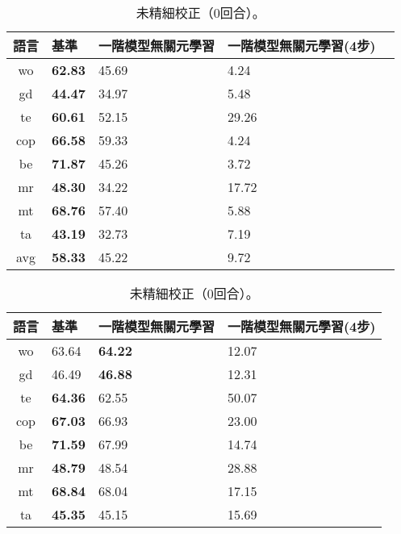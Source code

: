 \begin{table}[htbp]
    \begin{subtable}[h]{0.8\textwidth}
        \centering
            \begin{tabular}[!ht]{c|llll}
                \hline
                語言 & 基準 & 一階模型無關元學習 & 一階模型無關元學習(4步) \\
                \hline\hline
                wo & \textbf{62.83} & 45.69 & 4.24 \\
                gd & \textbf{44.47} & 34.97 & 5.48 \\
                te & \textbf{60.61} & 52.15 & 29.26 \\
                cop & \textbf{66.58} & 59.33 & 4.24 \\
                be & \textbf{71.87} & 45.26 & 3.72 \\
                mr & \textbf{48.30} & 34.22 & 17.72 \\
                mt & \textbf{68.76} & 57.40 & 5.88 \\
                ta & \textbf{43.19} & 32.73 & 7.19 \\
                \hline
                avg & \textbf{58.33} & 45.22 & 9.72 \\
                \hline
            \end{tabular}
            \caption{未精細校正（0回合）。}
    \end{subtable}
    \vfill
    \begin{subtable}[h]{0.8\textwidth}
        \centering
            \begin{tabular}[!ht]{c|lll}
                \hline
                語言 & 基準 & 一階模型無關元學習 & 一階模型無關元學習(4步) \\
                \hline\hline
                wo & 63.64 & \textbf{64.22} & 12.07 \\
                gd & 46.49 & \textbf{46.88} & 12.31 \\
                te & \textbf{64.36} & 62.55 & 50.07 \\
                cop & \textbf{67.03} & 66.93 & 23.00 \\
                be & \textbf{71.59} & 67.99 & 14.74 \\
                mr & \textbf{48.79} & 48.54 & 28.88 \\
                mt & \textbf{68.84} & 68.04 & 17.15 \\
                ta & \textbf{45.35} & 45.15 & 15.69 \\
                \hline

\end{tabular}
\end{subtable}
\end{table}
